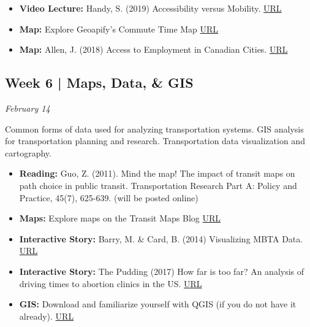 \documentclass[11pt]{article}
\begin{document}
	\begin{itemize}
		
		
		
		\item \textbf{Video Lecture:} Handy, S. (2019) Accessibility versus Mobility.  \href{https://www.youtube.com/watch?v=4OMv6CqrzvE}{URL}	
		
		\item \textbf{Map:} Explore Geoapify's Commute Time Map \href{https://commutetimemap.com/}{URL}
		
		\item \textbf{Map:} Allen, J. (2018) Access to Employment in
		Canadian Cities. \href{https://sausy-lab.github.io/canada-transit-access/map.html}{URL}
		
		
		
	\end{itemize}
	
	
	
	
	
	
	\subsection*{Week 6 | Maps, Data, \& GIS}
	
	\textit{February 14}
		
	Common forms of data used for analyzing transportation systems. GIS analysis for transportation planning and research. Transportation data visualization and cartography.
	
	
	\begin{itemize}
		
		\item \textbf{Reading:} Guo, Z. (2011). Mind the map! The impact of transit maps on path choice in public transit. Transportation Research Part A: Policy and Practice, 45(7), 625-639. (will be posted online)
		
		\item \textbf{Maps:} Explore maps on the Transit Maps Blog \href{http://transitmap.net/}{URL}
		
		\item \textbf{Interactive Story:} Barry, M. \& Card, B. (2014) Visualizing MBTA Data. \href{http://mbtaviz.github.io/}{URL}
		
		\item \textbf{Interactive Story:} The Pudding (2017) How far is too far? An analysis of driving times to abortion clinics in the US. \href{https://pudding.cool/2017/09/clinics/}{URL}
		
		\item \textbf{GIS:} Download and familiarize yourself with QGIS (if you do not have it already). \href{https://www.qgis.org/en/site/index.html}{URL} 
		
		
	\end{itemize}
	
\end{document}
